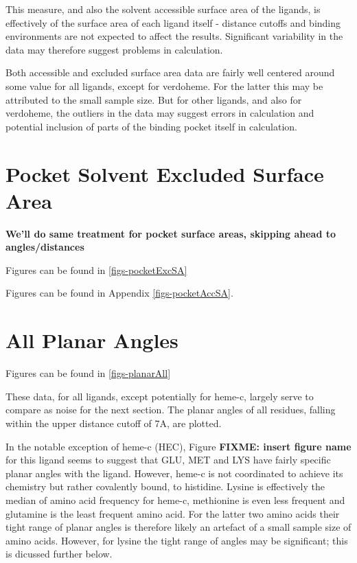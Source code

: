 \documentclass[a4paper, nobind]{templates/ociamthesis}
\begin{document}
This measure, and also the solvent accessible surface area of the ligands, is effectively of the surface area of each ligand itself - distance cutoffs and binding environments are not expected to affect the results. Significant variability in the data may therefore suggest problems in calculation.

Both accessible and excluded surface area data are fairly well centered around some value for all ligands, except for verdoheme. For the latter this may be attributed to the small sample size. But for other ligands, and also for verdoheme, the outliers in the data may suggest errors in calculation and potential inclusion of parts of the binding pocket itself in calculation.

\hypertarget{pocket-solvent-excluded-surface-area}{%
\section{Pocket Solvent Excluded Surface Area}\label{pocket-solvent-excluded-surface-area}}

\textbf{We'll do same treatment for pocket surface areas, skipping ahead to angles/distances}

Figures can be found in \ref{figs-pocketExcSA}

Figures can be found in Appendix \ref{figs-pocketAccSA}.

\hypertarget{all-planar-angles}{%
\section{All Planar Angles}\label{all-planar-angles}}

Figures can be found in \ref{figs-planarAll}

These data, for all ligands, except potentially for heme-c, largely serve to compare as noise for the next section. The planar angles of all residues, falling within the upper distance cutoff of 7A, are plotted.

In the notable exception of heme-c (HEC), Figure \textbf{FIXME: insert figure name} for this ligand seems to suggest that GLU, MET and LYS have fairly specific planar angles with the ligand. However, heme-c is not coordinated to achieve its chemistry but rather covalently bound, to histidine. Lysine is effectively the median of amino acid frequency for heme-c, methionine is even less frequent and glutamine is the least frequent amino acid. For the latter two amino acids their tight range of planar angles is therefore likely an artefact of a small sample size of amino acids. However, for lysine the tight range of angles may be significant; this is dicussed further below.
\end{document}
